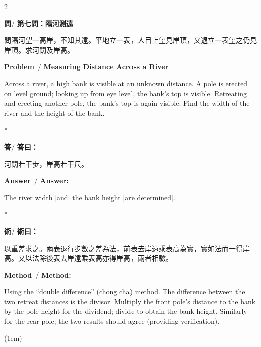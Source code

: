 \documentclass[11pt,a4paper]{article}
\newcommand{\wen}{\textbf{\color{sectioncolor}問}}
\newcommand{\da}{\textbf{\color{answercolor}答}}
\newcommand{\shu}{\textbf{\color{methodcolor}術}}
\newcommand{\prb}{\textbf{\color{sectioncolor}Problem}}
\newcommand{\ans}{\textbf{\color{answercolor}Answer}}
\newcommand{\meth}{\textbf{\color{methodcolor}Method}}
\begin{document}
\begin{paracol}{2}

\begin{leftcolumn*}
\wen / \textbf{第七問：隔河測遠}

問隔河望一高岸，不知其遠。平地立一表，人目上望見岸頂，又退立一表望之仍見岸頂。求河闊及岸高。
\end{leftcolumn*}

\begin{rightcolumn}
\prb\ / \textbf{Measuring Distance Across a River}

Across a river, a high bank is visible at an unknown 
distance. A pole is erected on level ground; looking up from eye level, 
the bank's top is visible. Retreating and erecting another pole, the 
bank's top is again visible. Find the width of the river and the height 
of the bank.
\end{rightcolumn}

\switchcolumn[0]*

\begin{leftcolumn*}
\da / \textbf{答曰：}

河闊若干步，岸高若干尺。
\end{leftcolumn*}

\begin{rightcolumn}
\ans\ / \textbf{Answer:}

The river width [and] the bank height [are determined].
\end{rightcolumn}

\switchcolumn[0]*

\begin{leftcolumn*}
\shu / \textbf{術曰：}

以重差求之。兩表退行步數之差為法，前表去岸遠乘表高為實，實如法而一得岸高。又以法除後表去岸遠乘表高亦得岸高，兩者相驗。
\end{leftcolumn*}

\begin{rightcolumn}
\meth\ / \textbf{Method:}

Using the ``double difference'' (chong cha) method. The 
difference between the two retreat distances is the divisor. Multiply 
the front pole's distance to the bank by the pole height for the dividend; 
divide to obtain the bank height. Similarly for the rear pole; the two 
results should agree (providing verification).
\end{rightcolumn}

\end{paracol}

\vspace(1em)
\end{document}
